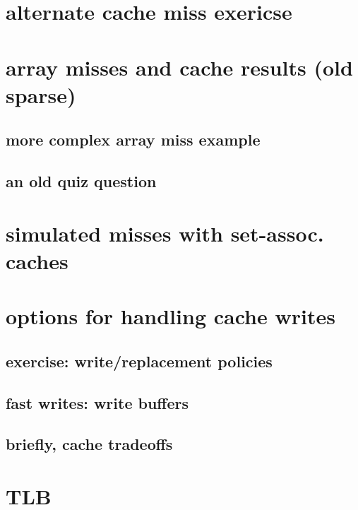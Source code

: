 \section{alternate cache miss exericse}


\section{array misses and cache results (old sparse)}


\subsection{more complex array miss example}


\subsection{an old quiz question}


\section{simulated misses with set-assoc. caches}


\section{options for handling cache writes}


\subsection{exercise: write/replacement policies}


\subsection{fast writes: write buffers}


\subsection{briefly, cache tradeoffs}


\section{TLB}

